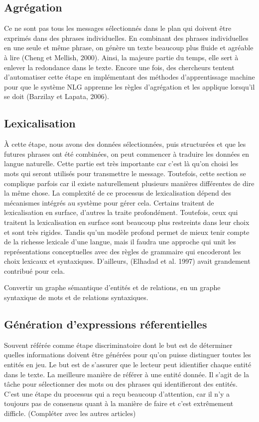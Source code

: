 \subsection{Agrégation}
Ce ne sont pas tous les messages sélectionnés dans le plan qui doivent être exprimés dans des phrases individuelles. En combinant des phrases individuelles en une seule et même phrase, on génère un texte beaucoup plus fluide et agréable à lire (Cheng et Mellish, 2000). Ainsi, la majeure partie du temps, elle sert à enlever la redondance dans le texte. Encore une fois, des chercheurs tentent d'automatiser cette étape en implémentant des méthodes d'apprentissage machine pour que le système NLG apprenne les règles d'agrégation et les applique lorsqu'il se doit (Barzilay et Lapata, 2006).

\subsection{Lexicalisation}
À cette étape, nous avons des données sélectionnées, puis structurées et que les futures phrases ont été combinées, on peut commencer à traduire les données en langue naturelle. Cette partie est très importante car c'est là qu'on choisi les mots qui seront utilisés pour transmettre le message. Toutefois, cette section se complique parfois car il existe naturellement plusieurs manières différentes de dire la même chose. La complexité de ce processus de lexicalisation dépend des mécanismes intégrés au système pour gérer cela. Certains traitent de lexicalisation en surface, d'autres la traite profondément. Toutefois, ceux qui traitent la lexicalisation en surface sont beaucoup plus restreints dans leur choix et sont très rigides. Tandis qu'un modèle profond permet de mieux tenir compte de la richesse lexicale d'une langue, mais il faudra une approche qui unit les représentations conceptuelles avec des règles de grammaire qui encoderont les choix lexicaux et syntaxiques. D'ailleurs, (Elhadad et al. 1997) avait grandement contribué pour cela.

Convertir un graphe sémantique d'entités et de relations, en un graphe syntaxique de mots et de relations syntaxiques. 

\subsection{Génération d'expressions réferentielles}
Souvent référée comme étape discriminatoire dont le but est de déterminer quelles informations doivent être générées pour qu'on puisse distinguer toutes les entités en jeu. Le but est de s'assurer que le lecteur peut idientifier chaque entité dans le texte. La meilleure manière de référer à une entité donnée.
Il s'agit de la tâche pour sélectionner des mots ou des phrases qui identifieront des entités. C'est une étape du processus qui a reçu beaucoup d'attention, car il n'y a toujours pas de consensus quant à la manière de faire et c'est extrêmement difficle. (Compléter avec les autres articles)


